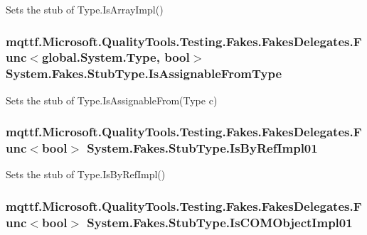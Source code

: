 Sets the stub of Type.\-Is\-Array\-Impl()

\hypertarget{class_system_1_1_fakes_1_1_stub_type_a2a638755c07b386d7096d6d4c37f063c}{
\subsubsection[{Is\-Assignable\-From\-Type}]{\setlength{\rightskip}{0pt plus 5cm}mqttf.\-Microsoft.\-Quality\-Tools.\-Testing.\-Fakes.\-Fakes\-Delegates.\-Func$<$global.\-System.\-Type, bool$>$ System.\-Fakes.\-Stub\-Type.\-Is\-Assignable\-From\-Type}}\label{class_system_1_1_fakes_1_1_stub_type_a2a638755c07b386d7096d6d4c37f063c}


Sets the stub of Type.\-Is\-Assignable\-From(\-Type c)

\hypertarget{class_system_1_1_fakes_1_1_stub_type_ac060b58752cfb3f9871698ab741f88ff}{
\subsubsection[{Is\-By\-Ref\-Impl01}]{\setlength{\rightskip}{0pt plus 5cm}mqttf.\-Microsoft.\-Quality\-Tools.\-Testing.\-Fakes.\-Fakes\-Delegates.\-Func$<$bool$>$ System.\-Fakes.\-Stub\-Type.\-Is\-By\-Ref\-Impl01}}\label{class_system_1_1_fakes_1_1_stub_type_ac060b58752cfb3f9871698ab741f88ff}


Sets the stub of Type.\-Is\-By\-Ref\-Impl()

\hypertarget{class_system_1_1_fakes_1_1_stub_type_a41e6ab3b03430bd94b54f7359a6a6cd2}{
\subsubsection[{Is\-C\-O\-M\-Object\-Impl01}]{\setlength{\rightskip}{0pt plus 5cm}mqttf.\-Microsoft.\-Quality\-Tools.\-Testing.\-Fakes.\-Fakes\-Delegates.\-Func$<$bool$>$ System.\-Fakes.\-Stub\-Type.\-Is\-C\-O\-M\-Object\-Impl01}}\label{class_system_1_1_fakes_1_1_stub_type_a41e6ab3b03430bd94b54f7359a6a6cd2}



